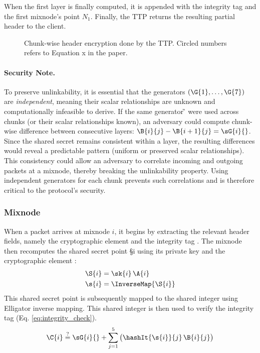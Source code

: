 When the first layer is finally computed, it is appended with the integrity tag  and the first mixnode's point $ N_1 $.
Finally, the TTP returns the resulting partial header to the client.

\begin{figure}[H]
    \centering
    \resizebox{1.\linewidth}{!}{}
    \caption{Chunk-wise header encryption done by the TTP. Circled numbers \eq[x] refers to Equation x in the paper.}
    \label{fig:chunked_schema}
\end{figure}


\paragraph{\textbf{Security Note.}}\label{note:security_why_indep_generators}
To preserve unlinkability, it is essential that the generators $ (\G{1}, \dots, \G{7}) $ are \textit{independent}, meaning their scalar relationships are unknown and computationally infeasible to derive.
If the same generator \G{} were used across chunks (or their scalar relationships known), an adversary could compute chunk-wise difference between consecutive layers: $ \B{i}{j} - \B{i+1}{j} = \sG{i}{} $.
Since the shared secret  remains consistent within a layer, the resulting differences would reveal a predictable pattern (uniform or preserved scalar relationships).
This consistency could allow an adversary to correlate incoming and outgoing packets at a mixnode, thereby breaking the unlinkability property.
Using independent generators for each chunk prevents such correlations and is therefore critical to the protocol's security.  


\subsubsection{Mixnode}

When a packet arrives at mixnode $i$, it begins by extracting the relevant header fields, namely the cryptographic element  and the integrity tag .  
The mixnode then recomputes the shared secret point \S{i} using its private key  and the cryptographic element :  
\begin{equation}
\begin{aligned}
    \S{i} &= \sk{i} \, \A{i} \\
    \s{i} &= \InverseMap{\S{i}}\\
\end{aligned}
\label{eq:derive_secret}
\end{equation}
This shared secret point is subsequently mapped to the shared integer  using Elligator inverse mapping.
This shared integer is then used to verify the integrity tag (Eq. \ref{eq:integrity_check}).
\begin{equation}
\C{i} \overset{\text{?}}{=} \sG{i}{} + \sum_{j=1}^{5} \big( \hashIt{\s{i}}{j} \, \B{i}{j} \big)
\label{eq:integrity_check}
\end{equation}

